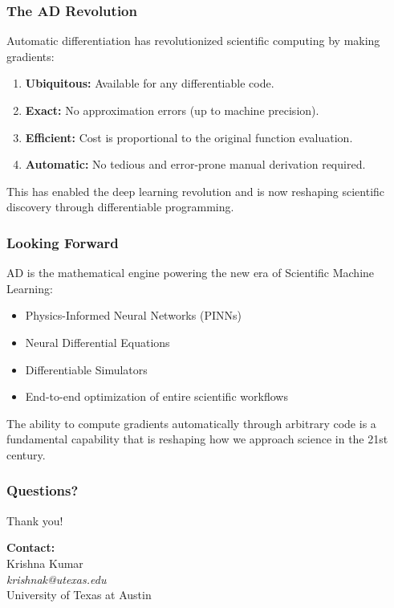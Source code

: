 \documentclass[notes]{beamer}
\begin{document}

\begin{frame}
\frametitle{The AD Revolution}

Automatic differentiation has revolutionized scientific computing by making gradients:

\begin{enumerate}
    \item \textbf{Ubiquitous:} Available for any differentiable code.
    \item \textbf{Exact:} No approximation errors (up to machine precision).
    \item \textbf{Efficient:} Cost is proportional to the original function evaluation.
    \item \textbf{Automatic:} No tedious and error-prone manual derivation required.
\end{enumerate}

\vspace{0.5cm}

This has enabled the deep learning revolution and is now reshaping scientific discovery through differentiable programming.

\end{frame}

\begin{frame}
\frametitle{Looking Forward}

AD is the mathematical engine powering the new era of Scientific Machine Learning:

\begin{itemize}
    \item Physics-Informed Neural Networks (PINNs)
    \item Neural Differential Equations
    \item Differentiable Simulators
    \item End-to-end optimization of entire scientific workflows
\end{itemize}

\vspace{1cm}

The ability to compute gradients automatically through arbitrary code is a fundamental capability that is reshaping how we approach science in the 21st century.

\end{frame}

\begin{frame}
\frametitle{Questions?}

\centering
\Large Thank you!

\vspace{2cm}

\textbf{Contact:} \\
Krishna Kumar \\
\textit{krishnak@utexas.edu} \\
University of Texas at Austin

\end{frame}
\end{document}

